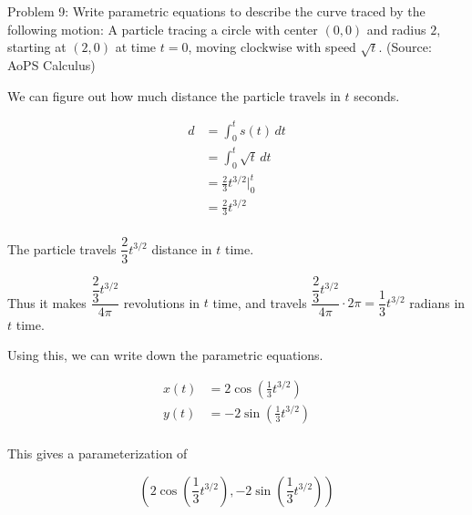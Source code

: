 Problem 9: Write parametric equations to describe the curve traced by the following motion: A particle tracing a circle with center $(0, 0)$ and radius $2$, starting at $(2, 0)$ at time $t = 0$, moving clockwise with speed $\sqrt t$. (Source: AoPS Calculus)

We can figure out how much distance the particle travels in $t$ seconds.

\begin{align*}
d &= \int_0^t s(t) \, dt \\
&= \int_0^t \sqrt t \, dt \\
&= \frac{2}{3} t^{3/2} \Bigg|_0^t \\
&= \frac{2}{3} t^{3/2} \\
\end{align*}

The particle travels $\dfrac{2}{3} t^{3/2}$ distance in $t$ time.

Thus it makes $\dfrac{\dfrac{2}{3} t^{3/2}}{4\pi}$ revolutions in $t$ time, and travels $\dfrac{\dfrac{2}{3} t^{3/2}}{4\pi} \cdot 2\pi = \dfrac{1}{3} t^{3/2}$ radians in $t$ time.

Using this, we can write down the parametric equations.

\begin{align*}
x(t) &= 2 \cos \left( \frac{1}{3} t^{3/2} \right) \\
y(t) &= -2 \sin \left( \frac{1}{3} t^{3/2} \right) \\
\end{align*}

This gives a parameterization of

$$ \boxed{\left(2 \cos \left( \frac{1}{3} t^{3/2} \right), -2 \sin \left( \frac{1}{3} t^{3/2} \right)\right)} $$
